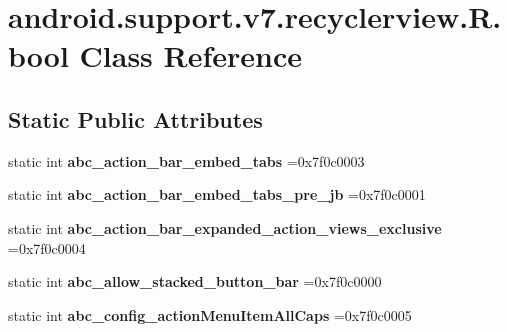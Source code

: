 \hypertarget{classandroid_1_1support_1_1v7_1_1recyclerview_1_1R_1_1bool}{}\section{android.\+support.\+v7.\+recyclerview.\+R.\+bool Class Reference}
\label{classandroid_1_1support_1_1v7_1_1recyclerview_1_1R_1_1bool}
\subsection*{Static Public Attributes}
\begin{DoxyCompactItemize}
\item 
\mbox{\label{classandroid_1_1support_1_1v7_1_1recyclerview_1_1R_1_1bool_a925627429d0855e220553d7ea4f8f2f9}} 
static int {\bfseries abc\+\_\+action\+\_\+bar\+\_\+embed\+\_\+tabs} =0x7f0c0003
\item 
\mbox{\label{classandroid_1_1support_1_1v7_1_1recyclerview_1_1R_1_1bool_a4a218ca43161cfb5bad1e17e63688b91}} 
static int {\bfseries abc\+\_\+action\+\_\+bar\+\_\+embed\+\_\+tabs\+\_\+pre\+\_\+jb} =0x7f0c0001
\item 
\mbox{\label{classandroid_1_1support_1_1v7_1_1recyclerview_1_1R_1_1bool_a6831a26f4b78c6508739cd2277f2df2d}} 
static int {\bfseries abc\+\_\+action\+\_\+bar\+\_\+expanded\+\_\+action\+\_\+views\+\_\+exclusive} =0x7f0c0004
\item 
\mbox{\label{classandroid_1_1support_1_1v7_1_1recyclerview_1_1R_1_1bool_a7bcf05869fc0e921da3c8ad95a6cc22b}} 
static int {\bfseries abc\+\_\+allow\+\_\+stacked\+\_\+button\+\_\+bar} =0x7f0c0000
\item 
\mbox{\label{classandroid_1_1support_1_1v7_1_1recyclerview_1_1R_1_1bool_a7e1787c3b3cedb5bd35f78beb309cd8e}} 
static int {\bfseries abc\+\_\+config\+\_\+action\+Menu\+Item\+All\+Caps} =0x7f0c0005
\item 
\mbox{\label{classandroid_1_1support_1_1v7_1_1recyclerview_1_1R_1_1bool_af64f6455622bf2aecc62602d16227670}} 

\end{DoxyCompactItemize}
